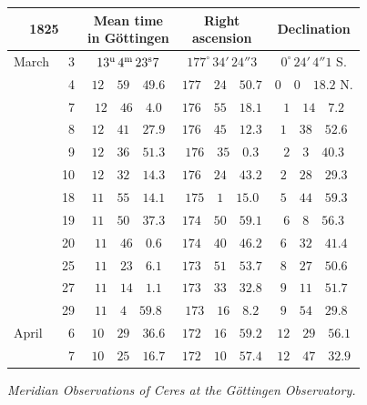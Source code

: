 \begin{center}
\begingroup\small\setlength{\tabcolsep}{4pt}
\begin{tabular}{lr|c|c|c}
\multicolumn{2}{c|}{1825} & \shortstack{Mean time\\in Göttingen} & \shortstack{Right\\ascension} & Declination \\
\hline
March & 3 & $13^{\rm u}\,4^{\rm m}\,23^{\rm s}7$ & $177^{\circ}\,34'\,24''3$ & $0^{\circ}\,24'\,4''1$ S. \\
 & 4 & $12\quad59\quad49.6$ & $177\quad24\quad50.7$ & $0\quad0\quad18.2$ N. \\
 & 7 & $12\quad46\quad4.0$ & $176\quad55\quad18.1$ & $1\quad14\quad7.2$ \\
 & 8 & $12\quad41\quad27.9$ & $176\quad45\quad12.3$ & $1\quad38\quad52.6$ \\
 & 9 & $12\quad36\quad51.3$ & $176\quad35\quad0.3$ & $2\quad3\quad40.3$ \\
 & 10 & $12\quad32\quad14.3$ & $176\quad24\quad43.2$ & $2\quad28\quad29.3$ \\
 & 18 & $11\quad55\quad14.1$ & $175\quad1\quad15.0$ & $5\quad44\quad59.3$ \\
 & 19 & $11\quad50\quad37.3$ & $174\quad50\quad59.1$ & $6\quad8\quad56.3$ \\
 & 20 & $11\quad46\quad0.6$ & $174\quad40\quad46.2$ & $6\quad32\quad41.4$ \\
 & 25 & $11\quad23\quad6.1$ & $173\quad51\quad53.7$ & $8\quad27\quad50.6$ \\
 & 27 & $11\quad14\quad1.1$ & $173\quad33\quad32.8$ & $9\quad11\quad51.7$ \\
 & 29 & $11\quad4\quad59.8$ & $173\quad16\quad8.2$ & $9\quad54\quad29.8$ \\
April & 6 & $10\quad29\quad36.6$ & $172\quad16\quad59.2$ & $12\quad29\quad56.1$ \\
 & 7 & $10\quad25\quad16.7$ & $172\quad10\quad57.4$ & $12\quad47\quad32.9$ \\
\end{tabular}
\endgroup
\end{center}

\begin{center}
\emph{Meridian Observations of Ceres at the Göttingen Observatory.}
\end{center}

